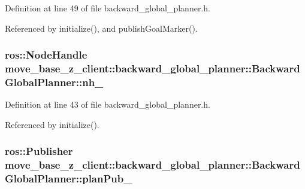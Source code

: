 Definition at line 49 of file backward\+\_\+global\+\_\+planner.\+h.



Referenced by initialize(), and publish\+Goal\+Marker().

\subsubsection[{\texorpdfstring{nh\+\_\+}{nh_}}]{\setlength{\rightskip}{0pt plus 5cm}ros\+::\+Node\+Handle move\+\_\+base\+\_\+z\+\_\+client\+::backward\+\_\+global\+\_\+planner\+::\+Backward\+Global\+Planner\+::nh\+\_\+\hspace{0.3cm}{\ttfamily [private]}}\hypertarget{classmove__base__z__client_1_1backward__global__planner_1_1BackwardGlobalPlanner_acc560c431ab390c2c32ba27fdbec95e6}{}\label{classmove__base__z__client_1_1backward__global__planner_1_1BackwardGlobalPlanner_acc560c431ab390c2c32ba27fdbec95e6}


Definition at line 43 of file backward\+\_\+global\+\_\+planner.\+h.



Referenced by initialize().

\subsubsection[{\texorpdfstring{plan\+Pub\+\_\+}{planPub_}}]{\setlength{\rightskip}{0pt plus 5cm}ros\+::\+Publisher move\+\_\+base\+\_\+z\+\_\+client\+::backward\+\_\+global\+\_\+planner\+::\+Backward\+Global\+Planner\+::plan\+Pub\+\_\+\hspace{0.3cm}{\ttfamily [private]}}\hypertarget{classmove__base__z__client_1_1backward__global__planner_1_1BackwardGlobalPlanner_ab074d9ac8ea790d7f5275ee27dae940c}{}\label{classmove__base__z__client_1_1backward__global__planner_1_1BackwardGlobalPlanner_ab074d9ac8ea790d7f5275ee27dae940c}


